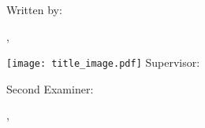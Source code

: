 \begin{titlepage}
  \centering
  {\scshape\paperinstitution\par}
  \vspace{1cm}
  {\scshape\Large\papertype\par}
  \vspace{1.5cm}
  {\huge\bfseries\papertitle\par}
  \vspace{.5cm}
  {\LARGE\bfseries\papersubtitle\par}
  \vspace{2cm}
  {\Large Written by:\par\paperauthor, \paperauthorclass}
  \vfill
  \texttt{[image: title\_image.pdf]}
  \vfill
  Supervisor:\par
  {\sc\papersupervisor\par}
  \vspace{.5cm}
  Second Examiner:\par
  {\sc\papercoreferent\par}
  \vspace{1cm}
  {\large\paperdate, \paperplace\par}
\end{titlepage}

